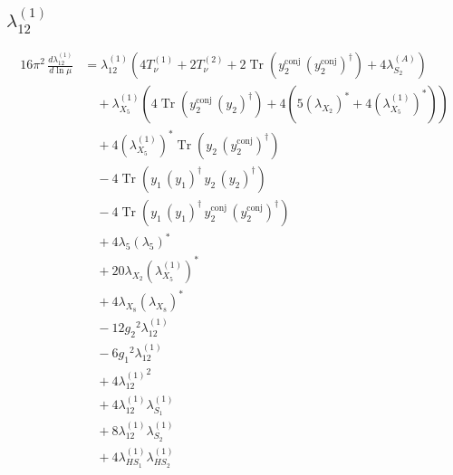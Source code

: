 \documentclass[10pt,a4paper]{article}
\begin{document}
\subsection*{$\lambda_{12}^{(1)}$}
\begin{align*}
16\pi^2\,\frac{d \lambda_{12}^{(1)}}{d\ln\mu} &={\lambda_{12}^{(1)}} (4 T_{\nu}^{(1)}+2 T_{\nu}^{(2)}+2 \operatorname{Tr}\!\left({y_{2}^{\mathrm{conj}}}\,\left({y_{2}^{\mathrm{conj}}}\right)^{\dagger}\right)+4 {\lambda_{S_2}^{(A)}}) \\
&\quad +{\lambda_{X_{5}}^{(1)}} (4 \operatorname{Tr}\!\left({y_{2}^{\mathrm{conj}}}\,\left({y_2}\right)^{\dagger}\right)+4 (5 \left({\lambda_{X_{2}}}\right)^{*}+4 \left({\lambda_{X_{5}}^{(1)}}\right)^{*})) \\
&\quad +4 \left({\lambda_{X_{5}}^{(1)}}\right)^{*} \operatorname{Tr}\!\left({y_2}\,\left({y_{2}^{\mathrm{conj}}}\right)^{\dagger}\right) \\
&\quad -4 \operatorname{Tr}\!\left({y_1}\,\left({y_1}\right)^{\dagger}\,{y_2}\,\left({y_2}\right)^{\dagger}\right) \\
&\quad -4 \operatorname{Tr}\!\left({y_1}\,\left({y_1}\right)^{\dagger}\,{y_{2}^{\mathrm{conj}}}\,\left({y_{2}^{\mathrm{conj}}}\right)^{\dagger}\right) \\
&\quad +4 {\lambda_5} \left({\lambda_5}\right)^{*} \\
&\quad +20 {\lambda_{X_{2}}} \left({\lambda_{X_{5}}^{(1)}}\right)^{*} \\
&\quad +4 {\lambda_{X_{8}}} \left({\lambda_{X_{8}}}\right)^{*} \\
&\quad -12 {g_2}^2 {\lambda_{12}^{(1)}} \\
&\quad -6 {g_1}^2 {\lambda_{12}^{(1)}} \\
&\quad +4 {\lambda_{12}^{(1)}}^2 \\
&\quad +4 {\lambda_{12}^{(1)}} {\lambda_{S_1}^{(1)}} \\
&\quad +8 {\lambda_{12}^{(1)}} {\lambda_{S_2}^{(1)}} \\
&\quad +4 {\lambda_{HS_1}^{(1)}} {\lambda_{HS_2}^{(1)}} \\
\end{align*}
\end{document}
